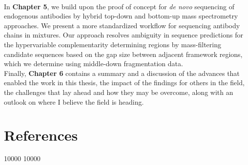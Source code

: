\bigskip\\
In \textbf{Chapter 5}, we build upon the proof of concept for \emph{de novo} sequencing of endogenous antibodies by hybrid top-down and bottom-up mass spectrometry approaches. We present a more standardized workflow for sequencing antibody chains in mixtures. Our approach resolves ambiguity in sequence predictions for the hypervariable complementarity determining regions by mass-filtering candidate sequences based on the gap size between adjacent framework regions, which we determine using middle-down fragmentation data.
\bigskip\\
Finally, \textbf{Chapter 6} contains a summary and a discussion of the advances that enabled the work in this thesis, the impact of the findings for others in the field, the challenges that lay ahead and how they may be overcome, along with an outlook on where I believe the field is heading.
\newpage
\section*{References}

\patchcmd{\thebibliography}
{}
{ 10000  10000}
{}{}

\stopthumb



